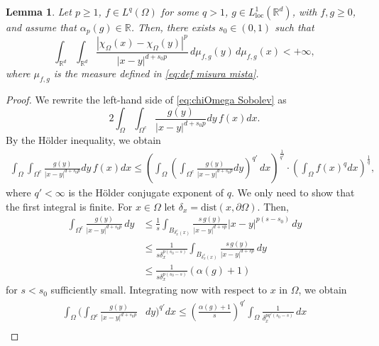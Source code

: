 \documentclass[reqno,11pt]{amsart}
\numberwithin{equation}{section}
\theoremstyle{definition} %
\theoremstyle{plain}
\newtheorem{lemma}[lemma]{Lemma}
\theoremstyle{definition}
\theoremstyle{remark}
\def\elle#1{L^{#1}}
\def\elleom#1{L^{#1}(\Omega)}
\def\O{\Omega}
\def\R{\mathbb{R}}
\def\Rd{\mathbb{R}^d}
\newcommand{\abs}[1]{\left|#1\right|}
\begin{document}
\begin{lemma}
\label{lemma:product}
Let $p\geq1$, $f\in\elleom q$ for some $q>1$, $g\in\elle1_{\text{loc}}(\Rd)$, with $f,g\geq 0$, and assume that $\alpha_p(g)\in\R$. Then, there exists $s_0\in (0,1)$ such that
\begin{equation}\label{eq:chiOmega Sobolev}
    \int_{\R^d}\int_{\R^d}\frac{\abs{\chi_{\Omega}(x)-\chi_{\Omega}(y)}^p}{\abs{x-y}^{d+s_0p}}\,d\mu_{f,g}(y)\,d\mu_{f,g}(x)<+\infty,
\end{equation}
where $\mu_{f,g}$ is the measure defined in \eqref{eq:def misura mista}.
\end{lemma}
\begin{proof}
We rewrite the left-hand side of \eqref{eq:chiOmega Sobolev} as
\begin{equation*}
    2\int_\O\int_{\O^c}\frac{g(y)}{\abs{x-y}^{d+s_0p}}dy\,f(x)dx.
\end{equation*}
By the H\"older inequality, we obtain
\begin{equation*}
    \begin{split}
        \int_\O\int_{\O^c}\frac{g(y)}{\abs{x-y}^{d+s_0p}}dy\,f(x)dx\leq \left(\int_\O\left(\int_{\O^c}\frac{g(y)}{\abs{x-y}^{d+s_0p}}dy\right)^{q'}\,dx\right)^{\frac{1}{q'}}\cdot\left(\int_\O f(x)^qdx\right)^{\frac{1}{q}},
    \end{split}
\end{equation*}
where $q'<\infty$ is the H\"older conjugate exponent of $q$. We only need to show that the first integral is finite. For $x\in\O$ let $\delta_x=\mathrm{dist}(x,\partial \O)$. Then,
\begin{equation*}
    \begin{split}
        \int_{\O^c}\frac{g(y)}{\abs{x-y}^{d+s_0p}}\,dy&\leq\frac{1}{s}\int_{B_{\delta^c_x(x)}}\frac{s\,g(y)}{\abs{x-y}^{d+sp}}\abs{x-y}^{p(s-s_0)}\,dy\\
        &\leq \frac{1}{s\delta_x^{p(s_0-s)}}\int_{B_{\delta^c_x(x)}}\frac{s\,g(y)}{\abs{x-y}^{d+sp}}\,dy\\
        &\leq \frac{1}{s\delta_x^{p(s_0-s)}}(\alpha(g)+1)
    \end{split}
\end{equation*}
for $s<s_0$ sufficiently small. Integrating now with respect to $x$ in $\O$, we obtain
\begin{equation*}
    \begin{split}
        \int_\O\bigg(\int_{\O^c}\frac{g(y)}{\abs{x-y}^{d+s_0p}}&dy\bigg)^{q'}dx\leq \left(\frac{\alpha(g)+1}{s}\right)^{q'}\int_\O\frac{1}{\delta_x^{pq'(s_0-s)}}\,dx\\

\end{split}
\end{equation*}
\end{proof}
\end{document}
